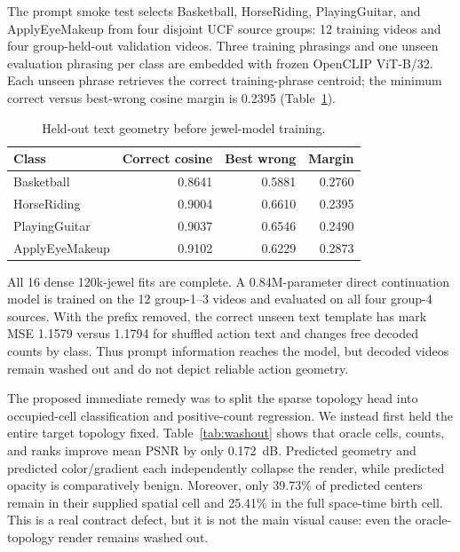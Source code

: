 \documentclass[10pt]{article}
\begin{document}
The prompt smoke test selects Basketball, HorseRiding, PlayingGuitar, and ApplyEyeMakeup from four
disjoint UCF source groups: 12 training videos and four group-held-out validation videos. Three
training phrasings and one unseen evaluation phrasing per class are embedded with frozen OpenCLIP
ViT-B/32. Each unseen phrase retrieves the correct training-phrase centroid; the minimum correct
versus best-wrong cosine margin is 0.2395 (Table~\ref{tab:prompt}).

\begin{table}[H]
\centering
\small
\caption{Held-out text geometry before jewel-model training.}
\label{tab:prompt}
\begin{tabular}{@{}lrrr@{}}
\toprule
Class & Correct cosine & Best wrong & Margin \\
\midrule
Basketball & 0.8641 & 0.5881 & 0.2760 \\
HorseRiding & 0.9004 & 0.6610 & 0.2395 \\
PlayingGuitar & 0.9037 & 0.6546 & 0.2490 \\
ApplyEyeMakeup & 0.9102 & 0.6229 & 0.2873 \\
\bottomrule
\end{tabular}
\end{table}

All 16 dense 120k-jewel fits are complete. A 0.84M-parameter direct continuation model is trained on
the 12 group-1--3 videos and evaluated on all four group-4 sources. With the prefix removed, the
correct unseen text template has mark MSE 1.1579 versus 1.1794 for shuffled action text and changes
free decoded counts by class. Thus prompt information reaches the model, but decoded videos remain
washed out and do not depict reliable action geometry.

The proposed immediate remedy was to split the sparse topology head into occupied-cell
classification and positive-count regression. We instead first held the entire target topology
fixed. Table~\ref{tab:washout} shows that oracle cells, counts, and ranks improve mean PSNR by only
\SI{0.172}{dB}. Predicted geometry and predicted color/gradient each independently collapse the
render, while predicted opacity is comparatively benign. Moreover, only 39.73\% of predicted
centers remain in their supplied spatial cell and 25.41\% in the full space-time birth cell. This is
a real contract defect, but it is not the main visual cause: even the oracle-topology render remains
washed out.
\end{document}
